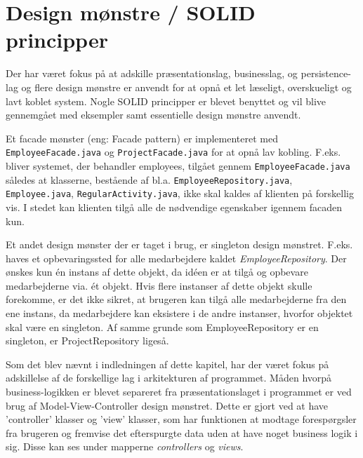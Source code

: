 \section{Design mønstre / SOLID principper}


Der har været fokus på at adskille præsentationslag, businesslag, og persistence-lag og flere design mønstre er anvendt for at opnå et let læseligt, overskueligt og lavt koblet system. Nogle SOLID principper er blevet benyttet og vil blive gennemgået med eksempler samt essentielle design mønstre anvendt.
\newline

\noindent Et facade mønster (eng: Facade pattern) er implementeret med \texttt{EmployeeFacade.java} og \texttt{ProjectFacade.java} for at opnå lav kobling. F.eks. bliver systemet, der behandler employees, tilgået gennem \texttt{EmployeeFacade.java} således at klasserne, bestående af bl.a. \texttt{EmployeeRepository.java}, \texttt{Employee.java}, \texttt{RegularActivity.java}, ikke skal kaldes af klienten på forskellig vis. I stedet kan klienten tilgå alle de nødvendige egenskaber igennem facaden kun.

Et andet design mønster der er taget i brug, er singleton design mønstret. F.eks. haves et opbevaringssted for alle medarbejdere kaldet \textit{EmployeeRepository}. Der ønskes kun én instans af dette objekt, da idéen er at tilgå og opbevare medarbejderne via. ét objekt. Hvis flere instanser af dette objekt skulle forekomme, er det ikke sikret, at brugeren kan tilgå alle medarbejderne fra den ene instans, da medarbejdere kan eksistere i de andre instanser, hvorfor objektet skal være en singleton. Af samme grunde som EmployeeRepository er en singleton, er ProjectRepository ligeså.
\newline

\noindent Som det blev nævnt i indledningen af dette kapitel, har der været fokus på adskillelse af de forskellige lag i arkitekturen af programmet. Måden hvorpå business-logikken er blevet separeret fra præsentationslaget i programmet er ved brug af Model-View-Controller design mønstret. Dette er gjort ved at have ’controller’ klasser og ’view’ klasser, som har funktionen at modtage forespørgsler fra brugeren og fremvise det efterspurgte data uden at have noget business logik i sig. Disse kan ses under mapperne \textit{controllers} og \textit{views}.

